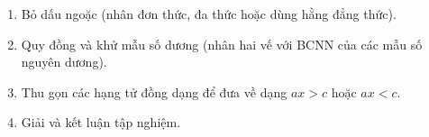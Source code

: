 \begin{enumerate}
\item Bỏ dấu ngoặc (nhân đơn thức, đa thức hoặc dùng hằng đẳng thức).
\item Quy đồng và khử mẫu số dương (nhân hai vế với BCNN của các mẫu số nguyên dương).
\item Thu gọn các hạng tử đồng dạng để đưa về dạng $ax > c$ hoặc $ax < c$.
\item Giải và kết luận tập nghiệm.
\end{enumerate}

